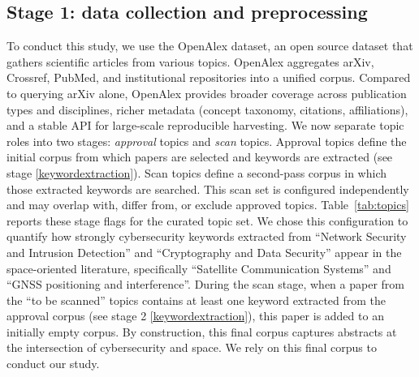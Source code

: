 \documentclass[pdflatex,sn-basic]{sn-jnl}
\begin{document}
\subsection{Stage 1: data collection and preprocessing}
To conduct this study, we use the OpenAlex dataset, an open source dataset that gathers scientific articles from various topics.
OpenAlex aggregates arXiv, Crossref, PubMed, and institutional repositories into a unified corpus.
Compared to querying arXiv alone, OpenAlex provides broader coverage across publication types and disciplines, richer metadata (concept taxonomy, citations, affiliations), and a stable API for large-scale reproducible harvesting.
We now separate topic roles into two stages: \textit{approval} topics and \textit{scan} topics.
Approval topics define the initial corpus from which papers are selected and keywords are extracted (see stage \ref{keywordextraction}).
Scan topics define a second-pass corpus in which those extracted keywords are searched.
This scan set is configured independently and may overlap with, differ from, or exclude approved topics.
Table~\ref{tab:topics} reports these stage flags for the curated topic set.
We chose this configuration to quantify how strongly cybersecurity keywords extracted from ``Network Security and Intrusion Detection'' and ``Cryptography and Data Security'' appear in the space-oriented literature,
specifically ``Satellite Communication Systems'' and ``GNSS positioning and interference''.
During the scan stage, when a paper from the ``to be scanned'' topics contains at least one keyword extracted from the approval corpus (see stage 2 \ref{keywordextraction}), this paper is added to an initially empty corpus. By construction, this final corpus captures abstracts at the intersection of cybersecurity and space. We rely on this final corpus to conduct our study.
\end{document}
